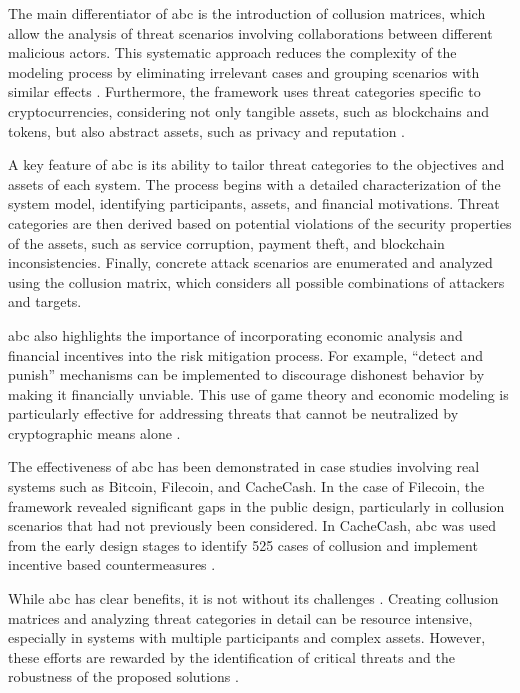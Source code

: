 The main differentiator of \gls{abc} is the introduction of collusion matrices,
which allow the analysis of threat scenarios involving collaborations between
different malicious actors. This systematic approach reduces the complexity of
the modeling process by eliminating irrelevant cases and grouping scenarios with
similar effects \cite{AbcCrypto}. Furthermore, the framework uses threat
categories specific to cryptocurrencies, considering not only tangible assets,
such as blockchains and tokens, but also abstract assets, such as privacy and
reputation \cite{AbcCrypto}.

A key feature of \gls{abc} is its ability to tailor threat categories to the
objectives and assets of each \cite{AbcCrypto} system. The process begins with a
detailed characterization of the system model, identifying participants, assets,
and financial motivations. Threat categories are then derived based on potential
violations of the security properties of the assets, such as service corruption,
payment theft, and blockchain inconsistencies. Finally, concrete attack
scenarios are enumerated and analyzed using the collusion matrix, which
considers all possible combinations of attackers and \cite{AbcCrypto} targets.

\gls{abc} also highlights the importance of incorporating economic analysis and
financial incentives into the risk mitigation process. For example, “detect and
punish” mechanisms can be implemented to discourage dishonest behavior by making
it financially unviable. This use of game theory and economic modeling is
particularly effective for addressing threats that cannot be neutralized by
cryptographic means alone \cite{AbcCrypto}.

The effectiveness of \gls{abc} has been demonstrated in case studies involving
real systems such as Bitcoin, Filecoin, and CacheCash. In the case of Filecoin,
the framework revealed significant gaps in the public design, particularly in
collusion scenarios that had not previously been considered. In CacheCash,
\gls{abc} was used from the early design stages to identify 525 cases of
collusion and implement incentive based countermeasures \cite{AbcCrypto}.

While \gls{abc} has clear benefits, it is not without its challenges
\cite{AbcCrypto}. Creating collusion matrices and analyzing threat categories in
detail can be resource intensive, especially in systems with multiple
participants and complex assets. However, these efforts are rewarded by the
identification of critical threats and the robustness of the proposed solutions
\cite{AbcCrypto}.

